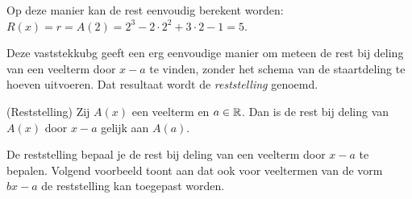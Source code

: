 \documentclass{ximera}
\begin{document}
Op deze manier kan de rest eenvoudig berekent worden: \(R(x) = r = A(2) = 2^3 - 2 \cdot 2^2 + 3 \cdot 2 - 1 = 5\).



Deze vaststekkubg geeft een erg eenvoudige manier om meteen de rest bij deling van een veelterm door \(x-a\) te vinden, zonder het schema van de staartdeling te hoeven uitvoeren. Dat resultaat wordt de \textit{ reststelling} genoemd.

\begin{theorem} (Reststelling)
Zij \(A(x)\) een veelterm en \(a \in \mathbb{R}\). Dan is de rest bij deling van \(A(x)\) door \(x-a\) gelijk aan \(A(a)\).
\end{theorem} 






De reststelling bepaal je de rest bij deling van een veelterm door \(x-a\) te bepalen. Volgend voorbeeld toont aan dat ook voor veeltermen van de vorm \(bx-a\) de reststelling kan toegepast worden. 
\end{document}
